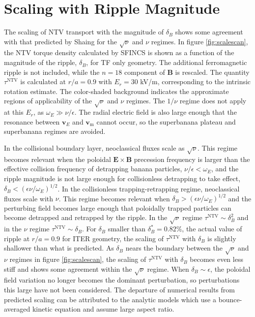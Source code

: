 \documentclass[aip, pop, preprint]{revtex4-1}
\numberwithin{figure}{section}
\numberwithin{equation}{section}
\begin{document}
\section{Scaling with Ripple Magnitude}\label{scaling}
The scaling of NTV transport with the magnitude of $\delta_B$ shows some agreement with that predicted by Shaing for the $\sqrt{\nu}$ and $\nu$ regimes.\cite{Shaing2008, Shaing2009} In figure \ref{fig:scalescan}, the NTV torque density calculated by SFINCS is shown as a function of the magnitude of the ripple, $\delta_B$, for TF only geometry. The additional ferromagnetic ripple is not included, while the $n= 18$ component of $\bm{B}$ is rescaled. The quantity $\tau^{\text{NTV}}$ is calculated at $r/a = 0.9$ with $E_r = 30$ kV/m, corresponding to the intrinsic rotation estimate. The color-shaded background indicates the approximate regions of applicability of the $\sqrt{\nu}$ and $\nu$ regimes. The $1/\nu$ regime does not apply at this $E_r$, as $\omega_E \gg \nu/\epsilon$.\cite{Shaing2003} The radial electric field is also large enough that the resonance between $\bm{v}_{E}$ and $\bm{v}_{\text{m}}$ cannot occur, so the superbanana plateau \cite{Shaing2009_sbp} and superbanana \cite{Shaing2009_sb} regimes are avoided. 

In the collisional boundary layer, neoclassical fluxes scale as $\sqrt{\nu}$.\cite{Shaing2008} This regime becomes relevant when the poloidal $\bm{E} \times \bm{B}$ precession frequency is larger than the effective collision frequency of detrapping banana particles, $\nu/\epsilon < \omega_E$, and the ripple magnitude is not large enough for collisionless detrapping to take effect, $\delta_B < \left(  \epsilon \nu/\omega_E \right)^{1/2}$. 
In the collisionless trapping-retrapping regime, neoclassical fluxes scale with $\nu$.\cite{Shaing2009} This regime becomes relevant when $\delta_B > \left(  \epsilon \nu/\omega_E \right)^{1/2}$ and the perturbing field becomes large enough that poloidally trapped particles can become detrapped and retrapped by the ripple. In the $\sqrt{\nu}$ regime $\tau^{\text{NTV}} \sim \delta_B^2$ and in the $\nu$ regime $\tau^{\text{NTV}} \sim \delta_B$. For $\delta_B$ smaller than $\delta_B^* = 0.82\%$, the actual value of ripple at $r/a=0.9$ for ITER geometry, the scaling of $\tau^{\text{NTV}}$ with $\delta_B$ is slightly shallower than what is predicted. 
As $\delta_B$ nears the boundary between the $\sqrt{\nu}$ and $\nu$ regimes in figure \ref{fig:scalescan}, the scaling of $\tau^{\text{NTV}}$ with $\delta_B$ becomes even less stiff and shows some agreement within the $\sqrt{\nu}$ regime. When $\delta_B \sim \epsilon$, the poloidal field variation no longer becomes the dominant perturbation, so perturbations this large have not been considered. The departure of numerical results from predicted scaling can be attributed to the analytic models which use a bounce-averaged kinetic equation and assume large aspect ratio. 
\end{document}
